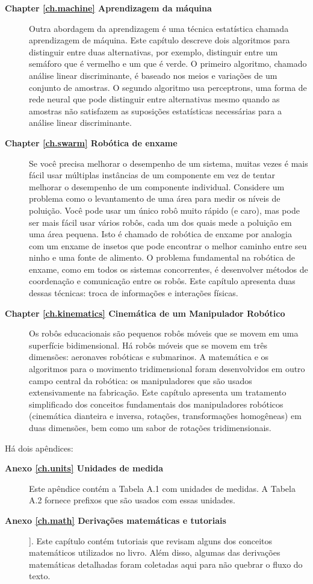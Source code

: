 \begin{description}
\smallskip
\item [\textbf{Chapter \ref{ch.machine} Aprendizagem da máquina}] Outra abordagem da aprendizagem é uma técnica estatística chamada aprendizagem de máquina. Este capítulo descreve dois algoritmos para distinguir entre duas alternativas, por exemplo, distinguir entre um semáforo que é vermelho e um que é verde. O primeiro algoritmo, chamado análise linear discriminante, é baseado nos meios e variações de um conjunto de amostras. O segundo algoritmo usa perceptrons, uma forma de rede neural que pode distinguir entre alternativas mesmo quando as amostras não satisfazem as suposições estatísticas necessárias para a análise linear discriminante.
\smallskip
\item [\textbf{Chapter \ref{ch.swarm} Robótica de enxame}] Se você precisa melhorar o desempenho de um sistema, muitas vezes é mais fácil usar múltiplas instâncias de um componente em vez de tentar melhorar o desempenho de um componente individual. Considere um problema como o levantamento de uma área para medir os níveis de poluição. Você pode usar um único robô muito rápido (e caro), mas pode ser mais fácil usar vários robôs, cada um dos quais mede a poluição em uma área pequena. Isto é chamado de robótica de enxame por analogia com um enxame de insetos que pode encontrar o melhor caminho entre seu ninho e uma fonte de alimento. O problema fundamental na robótica de enxame, como em todos os sistemas concorrentes, é desenvolver métodos de coordenação e comunicação entre os robôs. Este capítulo apresenta duas dessas técnicas: troca de informações e interações físicas.
\smallskip
\item [\textbf{Chapter \ref{ch.kinematics} Cinemática de um Manipulador Robótico}] Os robôs educacionais são pequenos robôs móveis que se movem em uma superfície bidimensional. Há robôs móveis que se movem em três dimensões: aeronaves robóticas e submarinos. A matemática e os algoritmos para o movimento tridimensional foram desenvolvidos em outro campo central da robótica: os manipuladores que são usados extensivamente na fabricação. Este capítulo apresenta um tratamento simplificado dos conceitos fundamentais dos manipuladores robóticos (cinemática dianteira e inversa, rotações, transformações homogêneas) em duas dimensões, bem como um sabor de rotações tridimensionais.
\end{description}

Há dois apêndices:
\begin{description}
\item [\textbf{Anexo \ref{ch.units} Unidades de medida}] Este apêndice contém a Tabela A.1 com unidades de medidas. A Tabela A.2 fornece prefixos que são usados com essas unidades.
\smallskip
\item [\textbf{Anexo \ref{ch.math} Derivações matemáticas e tutoriais}]]. Este capítulo contém tutoriais que revisam alguns dos conceitos matemáticos utilizados no livro. Além disso, algumas das derivações matemáticas detalhadas foram coletadas aqui para não quebrar o fluxo do texto.
\end{description}


